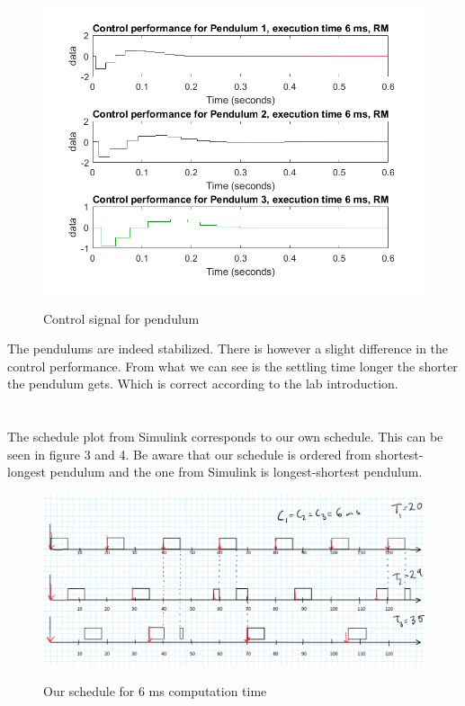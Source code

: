 \documentclass[12pt,a4paper]{article}
\begin{document}
    \begin{center}
      \begin{figure}
        \includegraphics[scale=0.5]{ex32.png}
        \label{fig:ex32}
      \caption{Control signal for pendulum}
      \end{figure}
    \end{center}

    The pendulums are indeed stabilized. There is however a slight difference
    in the control performance. From what we can see is the settling
    time longer the shorter the pendulum gets. Which is correct
    according to the lab introduction. 

\section{}%

The schedule plot from Simulink corresponds to our own schedule. This can be seen in figure 3 and 4. Be aware that our schedule is ordered from shortest-longest pendulum and the one from Simulink is longest-shortest pendulum.
    \begin{center}
      \begin{figure}
        \includegraphics[scale=0.3]{ex41.png}
        \label{fig:ex41}
        \caption{Our schedule for 6 ms computation time}
     \end{figure}
    \end{center}
    
\end{document}
